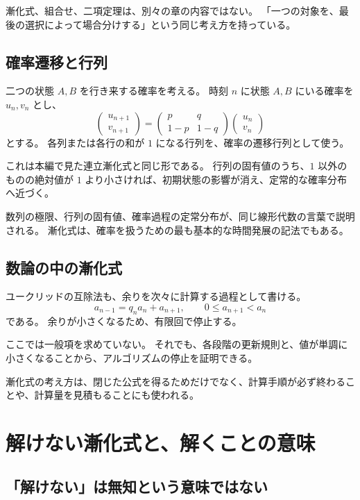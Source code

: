 漸化式、組合せ、二項定理は、別々の章の内容ではない。
「一つの対象を、最後の選択によって場合分けする」という同じ考え方を持っている。

\subsection{確率遷移と行列}

二つの状態 $A,B$ を行き来する確率を考える。
時刻 $n$ に状態 $A,B$ にいる確率を $u_n,v_n$ とし、
\[
  \begin{pmatrix}u_{n+1}\\v_{n+1}\end{pmatrix}
  =
  \begin{pmatrix}p&q\\1-p&1-q\end{pmatrix}
  \begin{pmatrix}u_n\\v_n\end{pmatrix}
\]
とする。
各列または各行の和が $1$ になる行列を、確率の遷移行列として使う。

これは本編で見た連立漸化式と同じ形である。
行列の固有値のうち、$1$ 以外のものの絶対値が $1$ より小さければ、初期状態の影響が消え、定常的な確率分布へ近づく。

数列の極限、行列の固有値、確率過程の定常分布が、同じ線形代数の言葉で説明される。
漸化式は、確率を扱うための最も基本的な時間発展の記法でもある。

\subsection{数論の中の漸化式}

ユークリッドの互除法も、余りを次々に計算する過程として書ける。
\[
  a_{n-1}=q_na_n+a_{n+1},
  \qquad 0\leq a_{n+1}<a_n
\]
である。
余りが小さくなるため、有限回で停止する。

ここでは一般項を求めていない。
それでも、各段階の更新規則と、値が単調に小さくなることから、アルゴリズムの停止を証明できる。

漸化式の考え方は、閉じた公式を得るためだけでなく、計算手順が必ず終わることや、計算量を見積もることにも使われる。

\section{解けない漸化式と、解くことの意味}

\subsection{「解けない」は無知という意味ではない}


